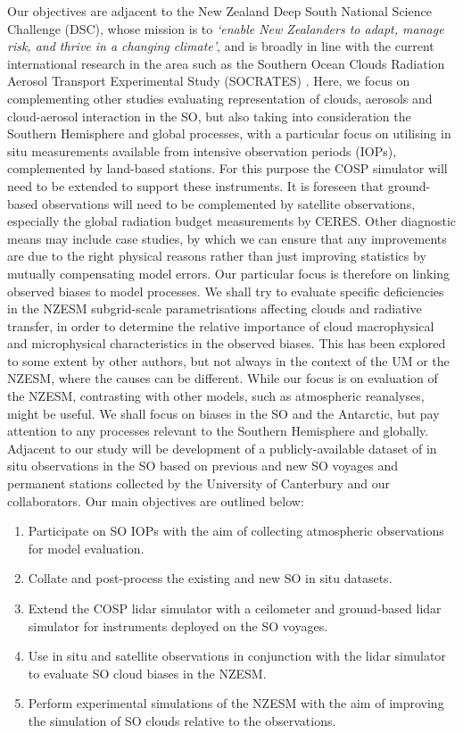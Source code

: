 Our objectives are adjacent to the New Zealand Deep South National
Science Challenge (DSC), whose mission is to \textit{`enable New Zealanders to adapt,
manage risk, and thrive in a changing climate'}, and is
broadly in line with the current international research in the area
such as the Southern Ocean Clouds
Radiation Aerosol Transport Experimental Study (SOCRATES) \citep{mcfarquhar2014}.
Here, we focus on complementing other studies evaluating
representation of clouds, aerosols and cloud-aerosol interaction in the SO,
but also taking into consideration the Southern Hemisphere and global processes,
with a particular focus on utilising in situ measurements
available from intensive observation periods (IOPs), complemented by land-based
stations. For this
purpose the COSP simulator will need to be extended to support these
instruments. It is foreseen that ground-based observations will need to be
complemented by satellite observations, especially the global radiation budget
measurements by CERES.
Other diagnostic means may include
case studies, by which we can ensure that any improvements are due to
the right physical reasons rather than just improving statistics by mutually
compensating model errors. Our particular focus is therefore on linking
observed biases to model processes. 
We shall try to evaluate specific deficiencies in the NZESM subgrid-scale
parametrisations affecting clouds and radiative transfer, in order to
determine the relative importance of cloud macrophysical and microphysical
characteristics in the observed biases. This has been explored to some extent
by other authors, but not always in the context of the UM or the NZESM,
where the causes can be different.
While our focus is on evaluation of the NZESM, contrasting with other
models, such as atmospheric reanalyses, might be useful.
We shall focus on biases in the SO and the
Antarctic, but pay attention to any processes relevant to the Southern
Hemisphere and globally.
Adjacent to our study will be development of a publicly-available dataset
of in situ observations in the SO based on previous and new SO voyages
and permanent stations collected by the University of Canterbury and our
collaborators.
Our main objectives are outlined below:

\begin{enumerate}
\item Participate on SO IOPs
with the aim of collecting atmospheric observations for model evaluation.
\item Collate and post-process the existing and new SO in situ datasets.
\item Extend the COSP lidar simulator with a ceilometer and ground-based lidar
simulator for instruments deployed on the SO voyages.
\item Use in situ and satellite observations in conjunction with the lidar simulator
to evaluate SO cloud biases in the NZESM.
\item Perform experimental simulations of the NZESM with the aim of
improving the simulation of SO clouds relative to the observations.
\end{enumerate}

